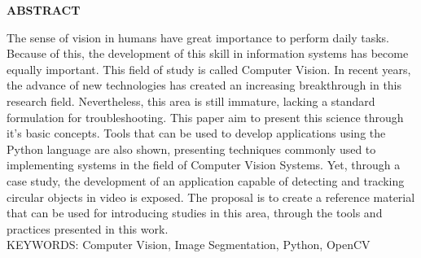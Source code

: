 \begin{center}
\textbf{ABSTRACT}
\end{center}

\singlespacing

\noindent The sense of vision in humans have great importance to perform daily tasks. Because of this, the development of this skill in information systems has become equally important. This field of study is called Computer Vision. In recent years, the advance of new technologies has created an increasing breakthrough in this research field. Nevertheless, this area is still immature, lacking a standard formulation for troubleshooting. This paper aim to present this science through it's basic concepts. Tools that can be used to develop applications using the Python language are also shown, presenting techniques commonly used to implementing systems in the field of Computer Vision Systems. Yet, through a case study, the development of an application capable of detecting and tracking circular objects in video is exposed. The proposal is to create a reference material that can be used for introducing studies in this area, through the tools and practices presented in this work. \\

\noindent KEYWORDS: Computer Vision, Image Segmentation, Python, OpenCV
